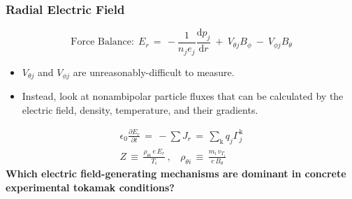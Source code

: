 \documentclass[10pt]{beamer}
\begin{document}
\begin{frame} %
\frametitle{Radial Electric Field}
\begin{equation} %
	\text{Force Balance:}~~E_r \,=\, -\frac{1}{n_j e_j}
		\frac{\text{d} p_j}{\text{d} r} ~+~ V_{\theta j} B_\phi
		~-~ V_{\phi j} B_\theta \label{eq:E_r}
\end{equation}
\begin{itemize}
	\item $V_{\theta j}$ and $V_{\phi j}$ are unreasonably-difficult to measure.
	\item Instead, look at nonambipolar particle fluxes that can be calculated by the electric field, density, temperature, and their gradients.
\end{itemize}
\begin{align} %
	\epsilon_0 \frac{\partial E_r}{\partial t} \,=\, -\sum J_r \,=\,
		\sum_\text{k} q_j\Gamma_j^\text{k} \label{eq:ambipolarity_constraint} \\
	Z \,\equiv\, \frac{\rho_{\theta i} \, e \, E_r}{T_i}~, ~~~~
		\rho_{\theta i} \,\equiv\, \frac{m_i \, v_{T_i}}{e \, B_\theta}
		\label{eq:Z_and_rho_definitions}
\end{align}
\textbf{Which electric field-generating mechanisms are dominant in concrete experimental tokamak conditions?}
\end{frame}

\end{document}
